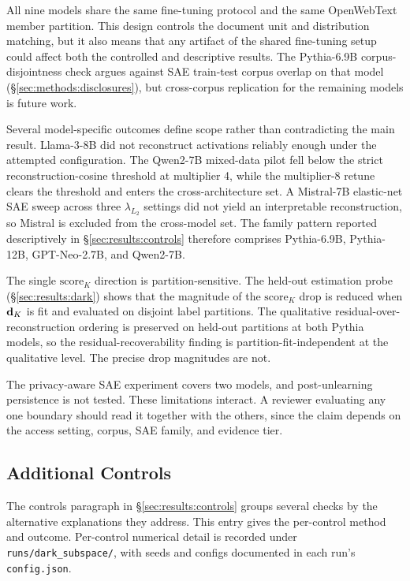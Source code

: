 All nine models share the same fine-tuning protocol and the same OpenWebText member partition. This design controls the document unit and distribution matching, but it also means that any artifact of the shared fine-tuning setup could affect both the controlled and descriptive results. The Pythia-6.9B corpus-disjointness check argues against SAE train-test corpus overlap on that model (\S\ref{sec:methods:disclosures}), but cross-corpus replication for the remaining models is future work.

Several model-specific outcomes define scope rather than contradicting the main result. Llama-3-8B did not reconstruct activations reliably enough under the attempted configuration. The Qwen2-7B mixed-data pilot fell below the strict reconstruction-cosine threshold at multiplier 4, while the multiplier-8 retune clears the threshold and enters the cross-architecture set. A Mistral-7B elastic-net SAE sweep across three $\lambda_{L_2}$ settings did not yield an interpretable reconstruction, so Mistral is excluded from the cross-model set. The family pattern reported descriptively in \S\ref{sec:results:controls} therefore comprises Pythia-6.9B, Pythia-12B, GPT-Neo-2.7B, and Qwen2-7B.

The single $\mathrm{score}_K$ direction is partition-sensitive. The held-out estimation probe (\S\ref{sec:results:dark}) shows that the magnitude of the $\mathrm{score}_K$ drop is reduced when $\mathbf{d}_K$ is fit and evaluated on disjoint label partitions. The qualitative residual-over-reconstruction ordering is preserved on held-out partitions at both Pythia models, so the residual-recoverability finding is partition-fit-independent at the qualitative level. The precise drop magnitudes are not.

The privacy-aware SAE experiment covers two models, and post-unlearning persistence is not tested. These limitations interact. A reviewer evaluating any one boundary should read it together with the others, since the claim depends on the access setting, corpus, SAE family, and evidence tier.

\subsection{Additional Controls}
\label{app:additional_controls}

The controls paragraph in \S\ref{sec:results:controls} groups several checks by the alternative explanations they address. This entry gives the per-control method and outcome. Per-control numerical detail is recorded under \texttt{runs/dark_subspace/}, with seeds and configs documented in each run's \texttt{config.json}.

